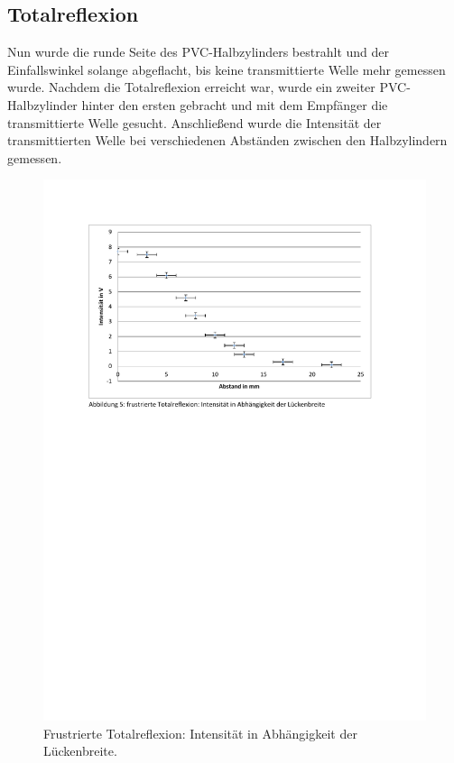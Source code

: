 \subsection{Totalreflexion}
Nun wurde die runde Seite des PVC-Halbzylinders bestrahlt und der Einfallswinkel solange abgeflacht, bis keine transmittierte Welle mehr gemessen wurde. Nachdem die Totalreflexion erreicht war, wurde ein zweiter PVC-Halbzylinder hinter den ersten gebracht und mit dem Empfänger die transmittierte Welle gesucht. Anschließend wurde die Intensität der transmittierten Welle bei verschiedenen Abständen zwischen den Halbzylindern gemessen.
\begin{figure}[H]
\centering
\includegraphics[width=\linewidth, trim=2.2cm 17.6cm 2.2cm 2.3cm, clip=true]{res/Nr5.pdf}
\caption{Frustrierte Totalreflexion: Intensität in Abhängigkeit der Lückenbreite.}
\label{fig:frustriert}
\end{figure}

